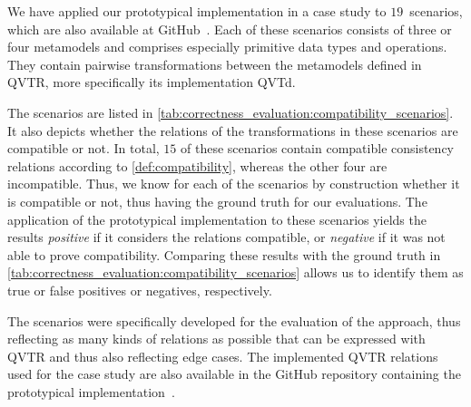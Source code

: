 We have applied our prototypical implementation in a case study to $19$~scenarios, which are also available at GitHub~\cite{decompositionGithub}.
Each of these scenarios consists of three or four metamodels and comprises especially primitive data types and operations.
They contain pairwise transformations between the metamodels defined in \gls{QVTR}, more specifically its implementation \gls{QVTd}.

The scenarios are listed in \autoref{tab:correctness_evaluation:compatibility_scenarios}.
It also depicts whether the relations of the transformations in these scenarios are compatible or not.
In total, $15$ of these scenarios contain compatible consistency relations according to \autoref{def:compatibility}, whereas the other four are incompatible.
Thus, we know for each of the scenarios by construction whether it is compatible or not, thus having the ground truth for our evaluations.
The application of the prototypical implementation to these scenarios yields the results \emph{positive} if it considers the relations compatible, or \emph{negative} if it was not able to prove compatibility.
Comparing these results with the ground truth in \autoref{tab:correctness_evaluation:compatibility_scenarios} allows us to identify them as true or false positives or negatives, respectively.

The scenarios were specifically developed for the evaluation of the approach, thus reflecting as many kinds of relations as possible that can be expressed with \gls{QVTR} and thus also reflecting edge cases.
The implemented \gls{QVTR} relations used for the case study are also available in the GitHub repository containing the prototypical implementation~\cite{decompositionGithub}.




